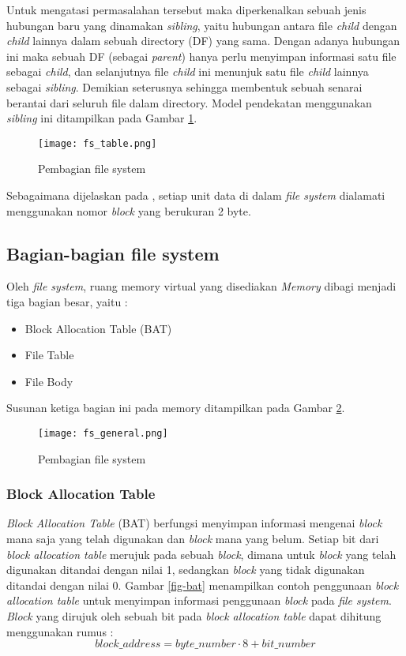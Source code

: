 Untuk mengatasi permasalahan tersebut maka diperkenalkan sebuah jenis hubungan baru yang dinamakan {\em sibling}, yaitu hubungan antara file {\em child} dengan {\em child} lainnya dalam sebuah directory (DF) yang sama. Dengan adanya hubungan ini maka sebuah DF (sebagai {\em parent}) hanya perlu menyimpan informasi satu file sebagai {\em child}, dan selanjutnya file {\em child} ini menunjuk satu file {\em child} lainnya sebagai {\em sibling}. Demikian seterusnya sehingga membentuk sebuah senarai berantai dari seluruh file dalam directory. Model pendekatan menggunakan {\em sibling} ini ditampilkan pada Gambar \ref{fig-file-relation}.

\begin{figure}[h]
\centering
\texttt{[image: fs\_table.png]}
\caption{Pembagian file system}
\label{fig-file-relation}
\end{figure}

Sebagaimana dijelaskan pada , setiap unit data di dalam {\em file system} dialamati menggunakan nomor {\em block} yang berukuran 2 byte. 

\subsection{Bagian-bagian file system}
\label{fs-partitioning}

Oleh {\em file system}, ruang memory virtual yang disediakan {\em Memory} dibagi menjadi tiga bagian besar, yaitu :
\begin{itemize}
\item Block Allocation Table (BAT)
\item File Table
\item File Body
\end{itemize}

Susunan ketiga bagian ini pada memory ditampilkan pada Gambar \ref{fig-fs-partition}.

\begin{figure}[h]
\centering
\texttt{[image: fs\_general.png]}
\caption{Pembagian file system}
\label{fig-fs-partition}
\end{figure}

\subsubsection{Block Allocation Table}

{\em Block Allocation Table} (BAT) berfungsi menyimpan informasi mengenai {\em block} mana saja yang telah digunakan dan {\em block} mana yang belum. Setiap bit dari {\em block allocation table} merujuk pada sebuah {\em block}, dimana untuk {\em block} yang telah digunakan ditandai dengan nilai 1, sedangkan {\em block} yang tidak digunakan ditandai dengan nilai 0. Gambar \ref{fig-bat} menampilkan contoh penggunaan {\em block allocation table} untuk menyimpan informasi penggunaan {\em block} pada {\em file system}. {\em Block} yang dirujuk oleh sebuah bit pada {\em block allocation table} dapat dihitung menggunakan rumus :
$$
block\_address=byte\_number\cdot8+bit\_number
$$

